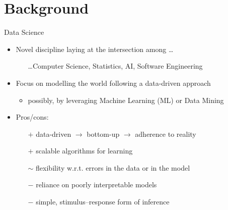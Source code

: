 \documentclass[presentation]{beamer}\mode<presentation>{\usetheme{AMSBolognaFC}}
\begin{document}
\section{Background}


\begin{frame}{Data Science}
    \begin{itemize}
        \item Novel discipline laying at the intersection among \ldots
        \begin{itemize}
            \item[] \ldots Computer Science, Statistics, AI, Software Engineering
        \end{itemize}
        
        \vfill 
        
        \item Focus on modelling the world following a \alert{data-driven} approach
        \begin{itemize}
            \item possibly, by leveraging \alert{Machine Learning} (ML) or Data Mining
        \end{itemize}
        
        \vfill

        \item Pros/cons:
        \begin{itemize}
            \item[$+$] data-driven $\rightarrow$ bottom-up $\rightarrow$ adherence to reality
            \item[$+$] scalable algorithms for learning
            \item[$\sim$] flexibility w.r.t. errors in the data or in the model
            \item[$-$] reliance on poorly interpretable models
            \item[$-$] simple, stimulus--response form of inference
        \end{itemize}
    \end{itemize}
\end{frame}
\end{document}
